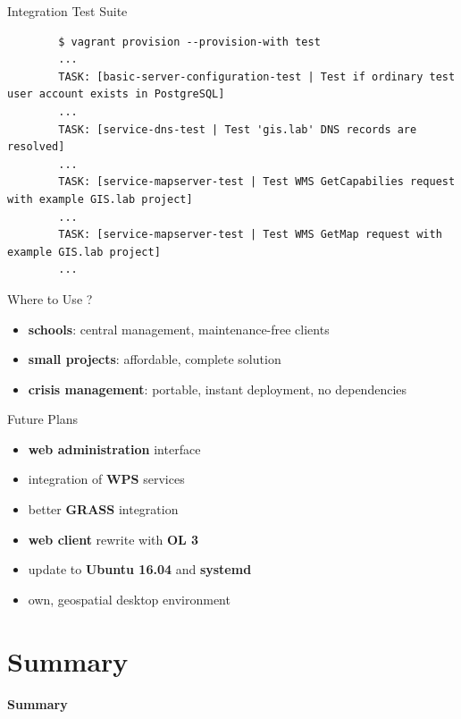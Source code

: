 \documentclass[12pt]{beamer}
\begin{document}
\begin{frame}[fragile]{Integration Test Suite}
	\lstset{language=sh}
	\begin{lstlisting}
		$ vagrant provision --provision-with test
		...
		TASK: [basic-server-configuration-test | Test if ordinary test user account exists in PostgreSQL]
		...
		TASK: [service-dns-test | Test 'gis.lab' DNS records are resolved]
		...
		TASK: [service-mapserver-test | Test WMS GetCapabilies request with example GIS.lab project]
		...
		TASK: [service-mapserver-test | Test WMS GetMap request with example GIS.lab project]
		...
	\end{lstlisting}
\end{frame}

\begin{frame}{Where to Use ?}
	\begin{itemize}
		\item \textbf{schools}: central management, maintenance-free clients
		\item \textbf{small projects}: affordable, complete solution
		\item \textbf{crisis management}: portable, instant deployment, no dependencies
	\end{itemize}
\end{frame}

\begin{frame}{Future Plans}
	\begin{itemize}
		\item \textbf{web administration} interface
		\item integration of \textbf{WPS} services
		\item better \textbf{GRASS} integration
		\item \textbf{web client} rewrite with \textbf{OL 3}
		\item update to \textbf{Ubuntu 16.04} and \textbf{systemd}
		\item own, geospatial desktop environment
	\end{itemize}
\end{frame}


\section{Summary}
\begin{frame}
	\begin{center}
		\LARGE\textbf{Summary}
	\end{center}
\end{frame}
\end{document}
